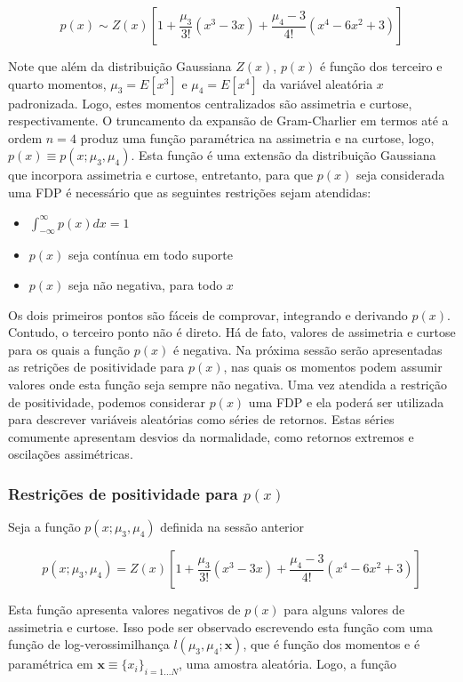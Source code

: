 \documentclass[]{article}
\providecommand{\tightlist}{%
  \setlength{\itemsep}{0pt}\setlength{\parskip}{0pt}}
\begin{document}
\[
p(x) \sim Z(x)\left[ 1 + \frac{\mu_3}{3!} (x^3 - 3x) + \frac{\mu_4 - 3}{4!} (x^4 - 6x^2 + 3) \right]
\]

Note que além da distribuição Gaussiana \(Z(x)\), \(p(x)\) é função dos
terceiro e quarto momentos, \(\mu_3 = E[x^3]\) e \(\mu_4 = E[x^4]\) da
variável aleatória \(x\) padronizada. Logo, estes momentos centralizados
são assimetria e curtose, respectivamente. O truncamento da expansão de
Gram-Charlier em termos até a ordem \(n=4\) produz uma função
paramétrica na assimetria e na curtose, logo,
\(p(x) \equiv p(x;\mu_3,\mu_4)\). Esta função é uma extensão da
distribuição Gaussiana que incorpora assimetria e curtose, entretanto,
para que \(p(x)\) seja considerada uma FDP é necessário que as seguintes
restrições sejam atendidas:

\begin{itemize}
\tightlist
\item
  \(\int_{-\infty}^{\infty}p(x) dx = 1\)
\item
  \(p(x)\) seja contínua em todo suporte
\item
  \(p(x)\) seja não negativa, para todo \(x\)
\end{itemize}

Os dois primeiros pontos são fáceis de comprovar, integrando e derivando
\(p(x)\). Contudo, o terceiro ponto não é direto. Há de fato, valores de
assimetria e curtose para os quais a função \(p(x)\) é negativa. Na
próxima sessão serão apresentadas as retrições de positividade para
\(p(x)\), nas quais os momentos podem assumir valores onde esta função
seja sempre não negativa. Uma vez atendida a restrição de positividade,
podemos considerar \(p(x)\) uma FDP e ela poderá ser utilizada para
descrever variáveis aleatórias como séries de retornos. Estas séries
comumente apresentam desvios da normalidade, como retornos extremos e
oscilações assimétricas.

\subsubsection{\texorpdfstring{Restrições de positividade para
\(p(x)\)}{Restrições de positividade para p(x)}}\label{restricoes-de-positividade-para-px}

Seja a função \(p(x;\mu_3, \mu_4)\) definida na sessão anterior

\[
p(x; \mu_3, \mu_4) = Z(x)\left[ 1 + \frac{\mu_3}{3!} (x^3 - 3x) + \frac{\mu_4 - 3}{4!} (x^4 - 6x^2 + 3) \right]
\]

Esta função apresenta valores negativos de \(p(x)\) para alguns valores
de assimetria e curtose. Isso pode ser observado escrevendo esta função
com uma função de log-verossimilhança \(l(\mu_3, \mu_4; \mathbf{x})\),
que é função dos momentos e é paramétrica em
\(\mathbf{x} \equiv \{x_i\}_{i=1...N}\), uma amostra aleatória. Logo, a
função
\end{document}
